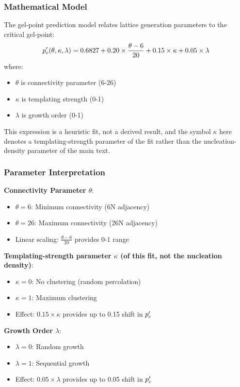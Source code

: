 \subsubsection{Mathematical Model}
The gel-point prediction model relates lattice generation parameters to the critical gel-point:
\begin{equation}
p_c'(\theta,\kappa,\lambda) = 0.6827 + 0.20 \times \frac{\theta-6}{20} + 0.15 \times \kappa + 0.05 \times \lambda
\end{equation}
where:
\begin{itemize}
    \item $\theta$ is connectivity parameter (6-26)
    \item $\kappa$ is templating strength (0-1)
    \item $\lambda$ is growth order (0-1)
\end{itemize}

This expression is a heuristic fit, not a derived result, and the symbol $\kappa$ here denotes a templating-strength parameter of the fit rather than the nucleation-density parameter of the main text.

\subsubsection{Parameter Interpretation}
\textbf{Connectivity Parameter $\theta$}:
\begin{itemize}
    \item $\theta = 6$: Minimum connectivity (6N adjacency)
    \item $\theta = 26$: Maximum connectivity (26N adjacency)
    \item Linear scaling: $\frac{\theta-6}{20}$ provides 0-1 range
\end{itemize}

\textbf{Templating-strength parameter $\kappa$ (of this fit, not the nucleation density)}:
\begin{itemize}
    \item $\kappa = 0$: No clustering (random percolation)
    \item $\kappa = 1$: Maximum clustering
    \item Effect: $0.15 \times \kappa$ provides up to 0.15 shift in $p_c'$
\end{itemize}

\textbf{Growth Order $\lambda$}:
\begin{itemize}
    \item $\lambda = 0$: Random growth
    \item $\lambda = 1$: Sequential growth
    \item Effect: $0.05 \times \lambda$ provides up to 0.05 shift in $p_c'$
\end{itemize}

